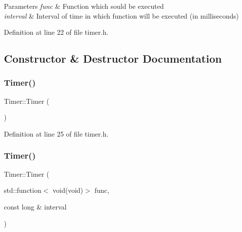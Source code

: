 \begin{DoxyParams}{Parameters}
{\em func} & Function which sould be executed \\
\hline
{\em interval} & Interval of time in which function will be executed (in milliseconds) \\
\hline
\end{DoxyParams}


Definition at line 22 of file timer.\+h.



\subsection{Constructor \& Destructor Documentation}
\mbox{\label{classTimer_a5f16e8da27d2a5a5242dead46de05d97}} 
\subsubsection{\texorpdfstring{Timer()}{Timer()}\hspace{0.1cm}{\footnotesize\ttfamily [1/2]}}
{\footnotesize\ttfamily Timer\+::\+Timer (\begin{DoxyParamCaption}{ }\end{DoxyParamCaption})\hspace{0.3cm}{\ttfamily [inline]}}



Definition at line 25 of file timer.\+h.

\mbox{\label{classTimer_a6e5fa1d67967d471f368218e1d0ae807}} 
\subsubsection{\texorpdfstring{Timer()}{Timer()}\hspace{0.1cm}{\footnotesize\ttfamily [2/2]}}
{\footnotesize\ttfamily Timer\+::\+Timer (\begin{DoxyParamCaption}\item[{std\+::function$<$ void(void)$>$}]{func,  }\item[{const long \&}]{interval }\end{DoxyParamCaption})\hspace{0.3cm}{\ttfamily [inline]}}



